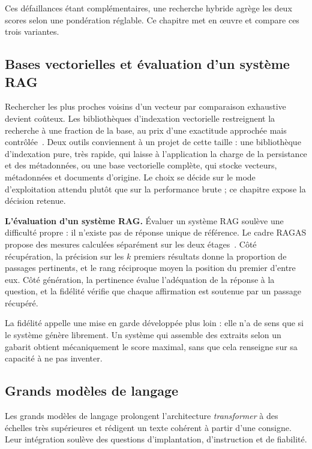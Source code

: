 Ces défaillances étant complémentaires, une recherche hybride agrège les deux scores selon une
pondération réglable. Ce chapitre met en œuvre et compare ces trois variantes.

\subsection{Bases vectorielles et évaluation d'un système RAG}

Rechercher les plus proches voisins d'un vecteur par comparaison exhaustive devient coûteux. Les
bibliothèques d'indexation vectorielle restreignent la recherche à une fraction de la base, au prix
d'une exactitude approchée mais contrôlée~\cite{johnson2021}. Deux outils conviennent à un projet de
cette taille : une bibliothèque d'indexation pure, très rapide, qui laisse à l'application la charge
de la persistance et des métadonnées, ou une base vectorielle complète, qui stocke vecteurs,
métadonnées et documents d'origine. Le choix se décide sur le mode d'exploitation attendu plutôt que
sur la performance brute ; ce chapitre expose la décision retenue.

\textbf{L'évaluation d'un système RAG.} Évaluer un système RAG soulève une difficulté propre : il n'existe pas de réponse unique de
référence. Le cadre RAGAS propose des mesures calculées séparément sur les deux
étages~\cite{es2024}. Côté récupération, la précision sur les $k$ premiers résultats donne la
proportion de passages pertinents, et le rang réciproque moyen la position du premier d'entre eux.
Côté génération, la pertinence évalue l'adéquation de la réponse à la question, et la fidélité
vérifie que chaque affirmation est soutenue par un passage récupéré.

La fidélité appelle une mise en garde développée plus loin : elle n'a de sens que si le
système génère librement. Un système qui assemble des extraits selon un gabarit obtient
mécaniquement le score maximal, sans que cela renseigne sur sa capacité à ne pas inventer.

\subsection{Grands modèles de langage}

Les grands modèles de langage prolongent l'architecture \emph{transformer} à des échelles très
supérieures et rédigent un texte cohérent à partir d'une consigne. Leur intégration soulève des
questions d'implantation, d'instruction et de fiabilité.


